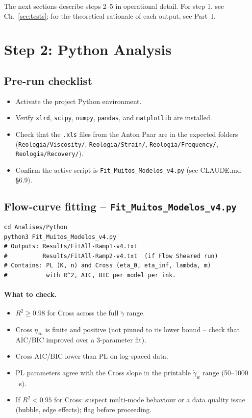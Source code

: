 \documentclass[11pt,a4paper]{article}
\newcommand{\gd}{\dot{\gamma}}
\begin{document}
\medskip The next sections describe steps 2--5 in operational detail.
For step 1, see Ch.~\ref{sec:tests}; for the theoretical rationale
of each output, see Part~I.

\section{Step 2: Python Analysis}
\label{sec:python}

\subsection{Pre-run checklist}
\begin{itemize}[leftmargin=1.4em,itemsep=1pt]
\item[$\square$] Activate the project Python environment.
\item[$\square$] Verify \texttt{xlrd}, \texttt{scipy}, \texttt{numpy},
  \texttt{pandas}, and \texttt{matplotlib} are installed.
\item[$\square$] Check that the \texttt{.xls} files from the Anton Paar
  are in the expected folders (\texttt{Reologia/Viscosity/},
  \texttt{Reologia/Strain/}, \texttt{Reologia/Frequency/},
  \texttt{Reologia/Recovery/}).
\item[$\square$] Confirm the active script is
  \texttt{Fit\_Muitos\_Modelos\_v4.py} (see CLAUDE.md \S6.9).
\end{itemize}

\subsection{Flow-curve fitting -- \texttt{Fit\_Muitos\_Modelos\_v4.py}}

\begin{lstlisting}[style=shell]
cd Analises/Python
python3 Fit_Muitos_Modelos_v4.py
# Outputs: Results/FitAll-Ramp1-v4.txt
#          Results/FitAll-Ramp2-v4.txt  (if Flow Sheared run)
# Contains: PL (K, n) and Cross (eta_0, eta_inf, lambda, m)
#           with R^2, AIC, BIC per model per ink.
\end{lstlisting}

\paragraph{What to check.}
\begin{itemize}[leftmargin=1.4em,itemsep=1pt]
\item $R^2\geq 0.98$ for Cross across the full $\gd$ range.
\item Cross $\eta_\infty$ is finite and positive (not pinned to its
  lower bound -- check that AIC/BIC improved over a 3-parameter fit).
\item Cross AIC/BIC lower than PL on log-spaced data.
\item PL parameters agree with the Cross slope in the printable
  $\gd_w$ range (50--1000\,\si{\per\s}).
\item If $R^2<0.95$ for Cross: suspect multi-mode behaviour or a
  data quality issue (bubble, edge effects); flag before proceeding.
\end{itemize}
\end{document}
